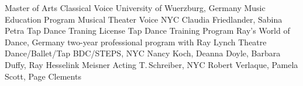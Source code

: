 \begin{cventries}
  \cventrytab
    {Master of Arts}
    {Classical Voice}
    {University of Wuerzburg, Germany}
    {Music Education Program}
 \cventrytab
    {}
    {Musical Theater Voice}
    {NYC}
    {Claudia Friedlander, Sabina Petra}
    \cventrytab
      {Tap Dance Traning License}
      {Tap Dance Training Program}
      {Ray's World of Dance, Germany}
      {two-year professional program with Ray Lynch}
    \cventrytab
      {}
      {Theatre Dance/Ballet/Tap}
      {BDC/STEPS, NYC}
      {Nancy Koch, Deanna Doyle, Barbara Duffy, Ray Hesselink}
    \cventrytab
      {}
      {Meisner Acting}
      {T.\,Schreiber, NYC}
      {Robert Verlaque, Pamela Scott, Page Clements}
\end{cventries}
